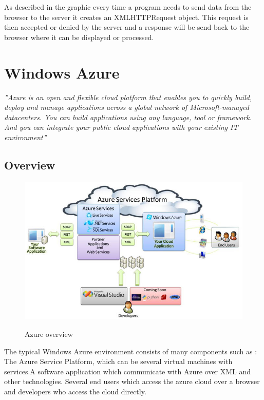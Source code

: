   As described in the graphic every time a program needs to send data from the browser to the server it creates an XMLHTTPRequest object. This request is then accepted or denied by the server and a response will be send back to the browser where it can be displayed or processed. 
  
  \section{Windows Azure}
  \textit{''Azure is an open and flexible cloud platform that enables you to quickly build, deploy and manage applications across a global network of Microsoft-managed datacenters. You can build applications using any language, tool or framework. And you can integrate your public cloud applications with your existing IT environment''}\cite{azure}
  \subsection{Overview}
  \begin{figure}[htbp]
  \centering
  \includegraphics[width=\textwidth,height=\textheight,keepaspectratio]{graphics/azurePlattform.jpg}
  \caption{Azure overview}\cite{azureOver}
  \end{figure}
  
  The typical Windows Azure environment consists of many components such as : The Azure Service Platform, which can be several virtual machines with services.A software application which communicate with Azure over XML and other technologies. Several end users which access the azure cloud over a browser and developers who access the cloud directly. 
  \newpage
